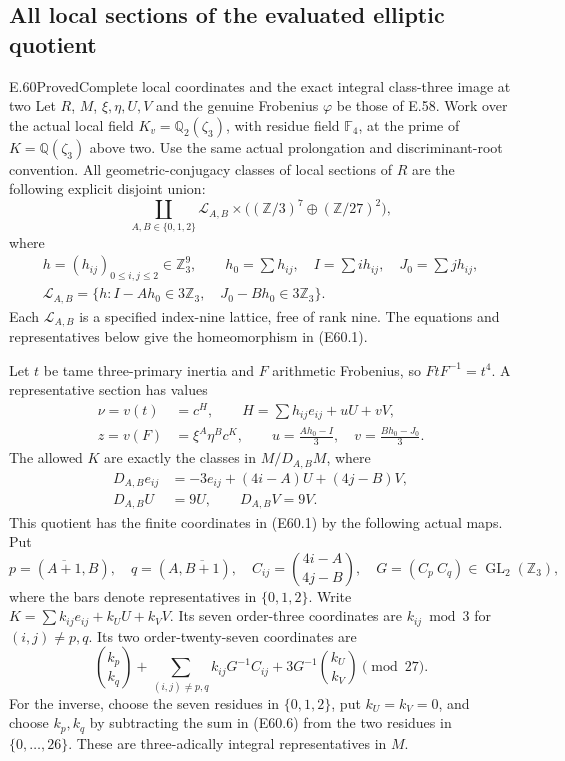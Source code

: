 \subsection{All local sections of the evaluated elliptic quotient}

\begin{statement}{E.60}{Proved}{Complete local coordinates and the exact integral class-three image at two}
Let $R$, $M$, $\xi,\eta,U,V$ and the genuine Frobenius
$\varphi$ be those of E.58. Work over the actual local field
$K_v=\mathbb Q_2(\zeta_3)$, with residue field $\mathbb F_4$,
at the prime of $K=\mathbb Q(\zeta_3)$ above two. Use the
same actual prolongation and discriminant-root convention.
All geometric-conjugacy classes of local sections of $R$
are the following explicit disjoint union:
\[
 \boxed{\quad
 \coprod_{A,B\in\{0,1,2\}}
       \mathcal L_{A,B}\times
              \bigl((\mathbb Z/3)^7\oplus(\mathbb Z/27)^2\bigr),
 \quad}
 \tag{E60.1}
\]
where
\[
 \begin{gathered}
 h=(h_{ij})_{0\le i,j\le2}\in\mathbb Z_3^9,
 \qquad h_0=\sum h_{ij},\quad
 I=\sum i h_{ij},\quad J_0=\sum j h_{ij},\\
 \mathcal L_{A,B}=
   \{h:I-Ah_0\in3\mathbb Z_3,\quad
                 J_0-Bh_0\in3\mathbb Z_3\}.
 \end{gathered}
 \tag{E60.2}
\]
Each $\mathcal L_{A,B}$ is a specified index-nine lattice,
free of rank nine. The equations and representatives below
give the homeomorphism in (E60.1).

Let $t$ be tame three-primary inertia and $F$ arithmetic
Frobenius, so $FtF^{-1}=t^4$. A representative section has
values
\[
 \begin{split}
 \nu=v(t)&=c^H,\qquad
 H=\sum h_{ij}e_{ij}+uU+vV,\\
 z=v(F)&=\xi^A\eta^B c^K,
 \qquad
 u=\frac{Ah_0-I}{3},\quad
 v=\frac{Bh_0-J_0}{3}.
 \end{split}
 \tag{E60.3}
\]
The allowed $K$ are exactly the classes in $M/D_{A,B}M$,
where
\[
 \begin{split}
 D_{A,B}e_{ij}&=-3e_{ij}+(4i-A)U+(4j-B)V,\\
 D_{A,B}U&=9U,\qquad D_{A,B}V=9V.
 \end{split}
 \tag{E60.4}
\]
This quotient has the finite coordinates in (E60.1) by
the following actual maps. Put
\[
 p=(\overline{A+1},B),\quad q=(A,\overline{B+1}),
 \quad C_{ij}=\binom{4i-A}{4j-B},
 \quad G=(C_p\ C_q)\in\operatorname{GL}_2(\mathbb Z_3),
 \tag{E60.5}
\]
where the bars denote representatives in $\{0,1,2\}$.
Write $K=\sum k_{ij}e_{ij}+k_UU+k_VV$.
Its seven order-three coordinates are $k_{ij}\bmod3$
for $(i,j)\ne p,q$. Its two order-twenty-seven coordinates are
\[
 \binom{k_p}{k_q}
   +\sum_{(i,j)\ne p,q} k_{ij}G^{-1}C_{ij}
   +3G^{-1}\binom{k_U}{k_V}\pmod {27}.
 \tag{E60.6}
\]
For the inverse, choose the seven residues in $\{0,1,2\}$,
put $k_U=k_V=0$, and choose $k_p,k_q$ by subtracting the
sum in (E60.6) from the two residues in $\{0,\ldots,26\}$.
These are three-adically integral representatives in $M$.


\end{statement}
